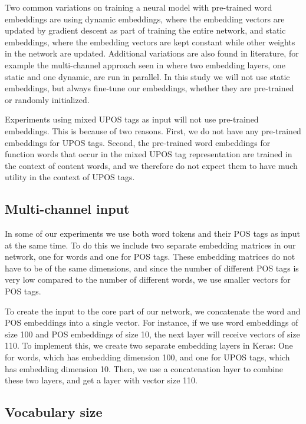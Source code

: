 Two common variations on training a neural model with pre-trained word
embeddings are using dynamic embeddings, where the embedding vectors are
updated by gradient descent as part of training the entire network, and
static embeddings, where the embedding vectors are kept constant while other
weights in the network are updated. Additional variations are also found in
literature, for example the multi-channel approach seen in
\textcite{kim2014convolutional} where two embedding layers, one static and
one dynamic, are run in parallel. In this study we will not use static
embeddings, but always fine-tune our embeddings, whether they are pre-trained
or randomly initialized.

Experiments using mixed UPOS tags as input will not use pre-trained
embeddings. This is because of two reasons. First, we do not have any
pre-trained embeddings for UPOS tags. Second, the pre-trained word embeddings
for function words that occur in the mixed UPOS tag representation are
trained in the context of content words, and we therefore do not expect them
to have much utility in the context of UPOS tags.


\subsection{Multi-channel input}

In some of our experiments we use both word tokens and their POS tags as
input at the same time. To do this we include two separate embedding matrices
in our network, one for words and one for POS tags. These embedding matrices
do not have to be of the same dimensions, and since the number of different
POS tags is very low compared to the number of different words, we use
smaller vectors for POS tags.

To create the input to the core part of our network, we concatenate the word
and POS embeddings into a single vector. For instance, if we use word
embeddings of size 100 and POS embeddings of size 10, the next layer will
receive vectors of size 110. To implement this, we create two separate
embedding layers in Keras: One for words, which has embedding dimension 100,
and one for UPOS tags, which has embedding dimension 10. Then, we use a
concatenation layer to combine these two layers, and get a layer with vector
size 110.


\subsection{Vocabulary size} \label{subsec:vocabsize}

